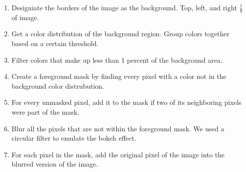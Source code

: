 \documentclass[12pt]{article}
\begin{document}
\begin{enumerate}
    \item
        Designiate the borders of the image as the background. Top, left, and
        right $\tfrac{1}{8}$ of image.
    \item
        Get a color distribution of the background region. Group colors together
        based on a certain threshold.
    \item
        Filter colors that make up less than 1 percent of the background area.
    \item
        Create a foreground mask by finding every pixel with a color not
        in the background color distrubution.
    \item
        For every unmasked pixel, add it to the mask if two of its neighboring
        pixels were part of the mask.
    \item
        Blur all the pixels that are not within the foreground mask. We used a
        circular filter to emulate the bokeh effect.
    \item
        For each pixel in the mask, add the original pixel of the image into
        the blurred version of the image.
\end{enumerate}
\end{document}
